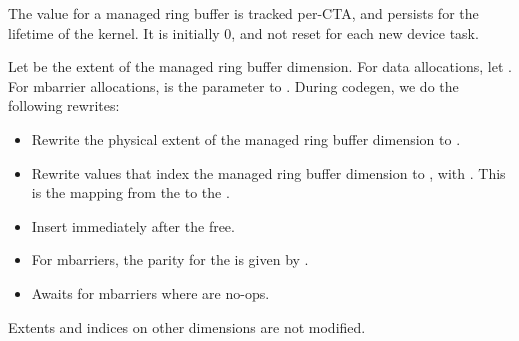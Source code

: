 
The  value for a managed ring buffer is tracked per-CTA, and persists for the lifetime of the kernel.
It is initially 0, and not reset for each new device task.

Let  be the extent of the managed ring buffer dimension.
For data allocations, let .
For mbarrier allocations,  is the parameter to .
During codegen, we do the following rewrites:

\begin{itemize}
  \item Rewrite the physical extent of the managed ring buffer dimension to .
  \item Rewrite values  that index the managed ring buffer dimension to ,
    with .
    This is the mapping from the  to the .
  \item Insert  immediately after the free.
  \item For mbarriers, the parity for the  is given by .
  \item Awaits for mbarriers where  are no-ops.
\end{itemize}

Extents and indices on other dimensions are not modified.

